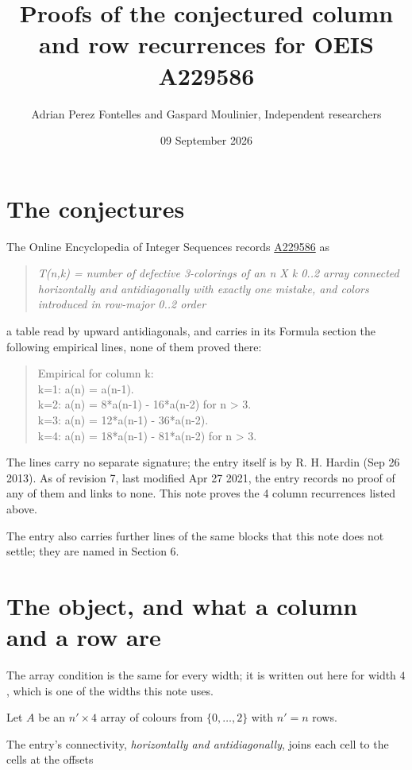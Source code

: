 \documentclass[11pt]{article}
\title{Proofs of the conjectured column and row recurrences for OEIS A229586}
\author{Adrian Perez Fontelles and Gaspard Moulinier, Independent researchers}
\date{09 September 2026}
\theoremstyle{definition}
\begin{document}
\maketitle
\section{The conjectures}

The Online Encyclopedia of Integer Sequences records \href{https://oeis.org/A229586}{A229586} as

\begin{quote}\itshape T(n,k) = number of defective 3-colorings of an n X k 0..2 array connected horizontally and antidiagonally with exactly one mistake, and colors introduced in row-major 0..2 order\end{quote}

a table read by upward antidiagonals, and carries in its Formula section the following empirical lines, none of them proved there:

\begin{quote}\ttfamily Empirical for column k:\\
k=1: a(n) = a(n-1).\\k=2: a(n) = 8*a(n-1) - 16*a(n-2) for n > 3.\\k=3: a(n) = 12*a(n-1) - 36*a(n-2).\\k=4: a(n) = 18*a(n-1) - 81*a(n-2) for n > 3.\end{quote}

The lines carry no separate signature; the entry itself is by R. H. Hardin (Sep 26 2013). As of revision 7, last modified Apr 27 2021, the entry records no proof of any of them and links to none. This note proves the 4 column recurrences listed above.

The entry also carries further lines of the same blocks that this note does not settle; they are named in Section 6.

\section{The object, and what a column and a row are}

The array condition is the same for every width; it is written out here for width $4$, which is one of the widths this note uses.

Let $A$ be an $n' \times 4$ array of colours from $\{0,\dots,2\}$ with $n' = n$ rows.

The entry's connectivity, {\itshape horizontally and antidiagonally}, joins each cell to the cells at the offsets
\end{document}
